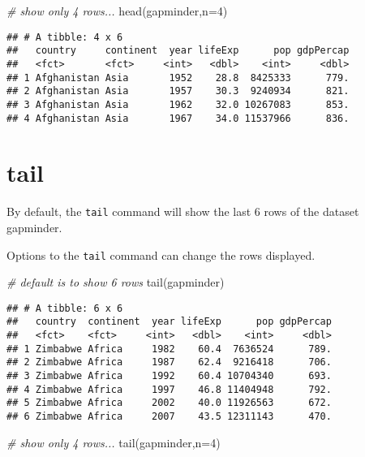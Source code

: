 \documentclass[
]{book}
\newenvironment{Shaded}{\begin{snugshade}}{\end{snugshade}}
\newcommand{\AttributeTok}[1]{\textcolor[rgb]{0.77,0.63,0.00}{#1}}
\newcommand{\CommentTok}[1]{\textcolor[rgb]{0.56,0.35,0.01}{\textit{#1}}}
\newcommand{\DecValTok}[1]{\textcolor[rgb]{0.00,0.00,0.81}{#1}}
\newcommand{\FunctionTok}[1]{\textcolor[rgb]{0.00,0.00,0.00}{#1}}
\newcommand{\NormalTok}[1]{#1}
\begin{document}
\begin{Shaded}
\begin{Highlighting}[]
\CommentTok{\# show only 4 rows...}
\FunctionTok{head}\NormalTok{(gapminder,}\AttributeTok{n=}\DecValTok{4}\NormalTok{)}
\end{Highlighting}
\end{Shaded}

\begin{verbatim}
## # A tibble: 4 x 6
##   country     continent  year lifeExp      pop gdpPercap
##   <fct>       <fct>     <int>   <dbl>    <int>     <dbl>
## 1 Afghanistan Asia       1952    28.8  8425333      779.
## 2 Afghanistan Asia       1957    30.3  9240934      821.
## 3 Afghanistan Asia       1962    32.0 10267083      853.
## 4 Afghanistan Asia       1967    34.0 11537966      836.
\end{verbatim}

\hypertarget{tail}{%
\section{tail}\label{tail}}

By default, the \texttt{tail} command will show the last 6 rows of the dataset gapminder.

Options to the \texttt{tail} command can change the rows displayed.

\begin{Shaded}
\begin{Highlighting}[]
\CommentTok{\# default is to show 6 rows}
\FunctionTok{tail}\NormalTok{(gapminder)}
\end{Highlighting}
\end{Shaded}

\begin{verbatim}
## # A tibble: 6 x 6
##   country  continent  year lifeExp      pop gdpPercap
##   <fct>    <fct>     <int>   <dbl>    <int>     <dbl>
## 1 Zimbabwe Africa     1982    60.4  7636524      789.
## 2 Zimbabwe Africa     1987    62.4  9216418      706.
## 3 Zimbabwe Africa     1992    60.4 10704340      693.
## 4 Zimbabwe Africa     1997    46.8 11404948      792.
## 5 Zimbabwe Africa     2002    40.0 11926563      672.
## 6 Zimbabwe Africa     2007    43.5 12311143      470.
\end{verbatim}

\begin{Shaded}
\begin{Highlighting}[]
\CommentTok{\# show only 4 rows...}
\FunctionTok{tail}\NormalTok{(gapminder,}\AttributeTok{n=}\DecValTok{4}\NormalTok{)}
\end{Highlighting}
\end{Shaded}
\end{document}
